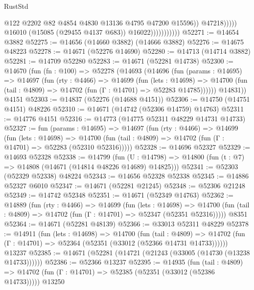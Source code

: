 \begin{lexlean}{RustStd}
\begin{coremodule}
                                        @122
                                        @2202
                                        @82
                                        @4854
                                        @4830
                                        @13136
                                        @4795
                                        @47200
                                        @15596))
                                    @47218)))))
                          @16010
                          (@15085 (@29455 @4137 @683))
                          @16022)))))))))))
@52271 := @14654 @3882
@52275 := @14656 (@14660 @3882) (@14666 @3882)
@52276 := @14675 @48223
@52278 := @14671 (@52276 @14690)
@52280 := @14713 (@14714 @3882)
@52281 := @14709 @52280
@52283 := @14671 (@52281 @14738)
@52300 := @14670
    (fun (fn : @100) =>
    @52278
      (@14693
        (@14696
          (fun (params : @14695) =>
          @14697
            (fun (rty : @4466) =>
            @14699
              (fun (lets : @14698) =>
              @14700 (fun (tail : @4809) => @14702 (fun (Γ : @14701) => @52283 @14785))))))
        @14831))
    @4151
@52303 := @14837 (@52276 (@14688 @4151))
@52306 := @14750 (@14751 @4151) @48226
@52310 := @14671 (@14742 (@52306 @14759) @14763)
@52311 := @14776 @4151
@52316 := @14773 (@14775 @52311 @48229 @14731 @14733)
@52327 := fun (params : @14695) =>
  @14697
    (fun (rty : @4466) =>
    @14699
      (fun (lets : @14698) =>
      @14700 (fun (tail : @4809) => @14702 (fun (Γ : @14701) => @52283 (@52310 @52316)))))
@52328 := @14696 @52327
@52329 := @14693 @52328
@52338 := @14799
    (fun (U : @14798) => @14800 (fun (t : @7) => @14808 (@14671 (@14814 @48226 @14689) @14825)))
@52341 := @52303 (@52329 @52338) @48224
@52343 := @14656 @52328 @52338
@52345 := @14886 @52327 @6010
@52347 := @14671 (@52281 @21245)
@52348 := @52306 @21248
@52349 := @14742 @52348
@52351 := @14671 (@52349 @14763)
@52362 := @14889
    (fun (rty : @4466) =>
    @14699
      (fun (lets : @14698) =>
      @14700 (fun (tail : @4809) => @14702 (fun (Γ : @14701) => @52347 (@52351 @52316)))))
    @8351
@52364 := @14671 (@52281 @48139)
@52366 := @33013 @52311 @48229
@52378 := @14911
    (fun (lets : @14698) =>
    @14700
      (fun (tail : @4809) =>
      @14702 (fun (Γ : @14701) => @52364 (@52351 (@33012 (@52366 @14731 @14733))))))
    @13237
@52385 := @14671 (@52281 (@14721 (@21243 (@33005 (@14730 (@13238 @14733))))))
@52386 := @52366 @13237
@52395 := @14935
    (fun (tail : @4809) => @14702 (fun (Γ : @14701) => @52385 (@52351 (@33012 (@52386 @14733)))))
    @13250

\end{coremodule}
\end{lexlean}
